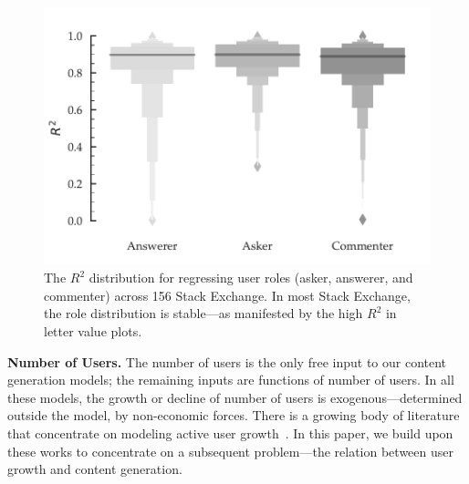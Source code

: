 \begin{figure}[hbt]
\vspace{-0.5\baselineskip}
\centering
\includegraphics[scale=0.45]{Figures/User_to_Roles_R_Squared_LV.pdf}
\vspace{-\baselineskip}
\caption{The $R^2$ distribution for regressing user roles (asker, answerer, and commenter) across 156 Stack Exchange. In most Stack Exchange, the role distribution is stable---as manifested by the high $R^2$ in letter value plots.}
\vspace{-\baselineskip}
\label{fig:roles}
\end{figure}

\textbf{Number of Users.} The number of users is the only free input to our content generation models; the remaining inputs are functions of number of users. In all these models, the growth or decline of number of users is exogenous---determined outside the model, by non-economic forces. There is a growing body of literature that concentrate on modeling active user growth~\cite{Ribeiro2014, zang2016}. In this paper, we build upon these works to concentrate on a subsequent problem---the relation between user growth and content generation.



